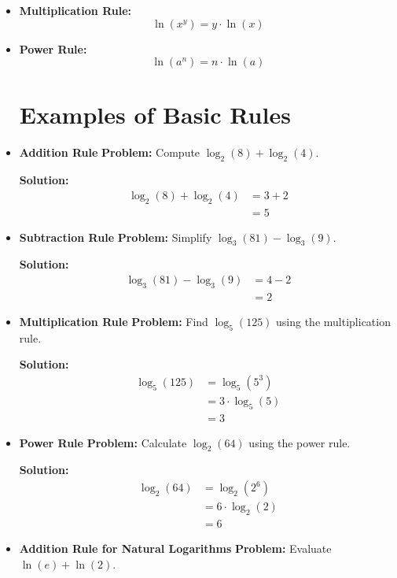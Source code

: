 \documentclass[a4paper,12pt]{article}
\begin{document}
\begin{itemize}
\item \textbf{Multiplication Rule:}
\begin{equation}
    \ln(x^y) = y \cdot \ln(x)
\end{equation}

\item \textbf{Power Rule:}
\begin{equation}
    \ln(a^n) = n \cdot \ln(a)
\end{equation}


\section{Examples of Basic Rules}

\item \textbf{Addition Rule}
\textbf{Problem:} Compute \( \log_2(8) + \log_2(4) \).

\textbf{Solution:}
\begin{align*}
    \log_2(8) + \log_2(4) &= 3 + 2 \\
    &= 5
\end{align*}

\item \textbf{Subtraction Rule}
\textbf{Problem:} Simplify \( \log_3(81) - \log_3(9) \).

\textbf{Solution:}
\begin{align*}
    \log_3(81) - \log_3(9) &= 4 - 2 \\
    &= 2
\end{align*}

\item \textbf{Multiplication Rule}
\textbf{Problem:} Find \( \log_5(125) \) using the multiplication rule.

\textbf{Solution:}
\begin{align*}
    \log_5(125) &= \log_5(5^3) \\
    &= 3 \cdot \log_5(5) \\
    &= 3
\end{align*}

\item \textbf{Power Rule}
\textbf{Problem:} Calculate \( \log_2(64) \) using the power rule.

\textbf{Solution:}
\begin{align*}
    \log_2(64) &= \log_2(2^6) \\
    &= 6 \cdot \log_2(2) \\
    &= 6
\end{align*}

\item \textbf{Addition Rule for Natural Logarithms}
\textbf{Problem:} Evaluate \( \ln(e) + \ln(2) \).


\end{itemize}
\end{document}
